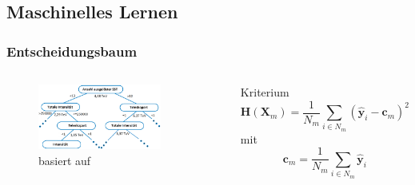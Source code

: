 \documentclass[aspectratio=1610, professionalfonts, 9pt]{beamer}
\begin{document}
  \subsection{Maschinelles Lernen}

  \begin{frame}
    \frametitle{Entscheidungsbaum}
    \begin{columns}
      \begin{figure}
        \includegraphics[width=0.8\textwidth]{pictures/Decisiontree.png}
        \caption{basiert auf \cite{DT}}
        \label{abb:DT}
      \end{figure}
      \begin{block}{Kriterium}
        \begin{equation*}
          \symbf{H}(\symbf{X}_m) = \frac{1}{N_m}\sum_{i\in N_m}(\symbf{\hat{y}}_i-\symbf{c}_m)^2
        \end{equation*}
        mit
        \begin{equation*}
          \symbf{c}_m = \frac{1}{N_m}\sum_{i\in N_m}\symbf{\hat{y}}_i
        \end{equation*}
      \end{block}
    \end{columns}

  \end{frame}
\end{document}
